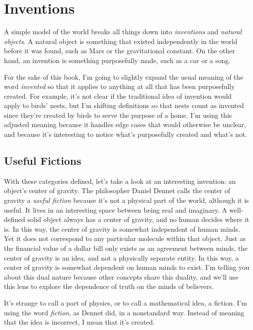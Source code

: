 \documentclass[9pt, twoside]{book}
\theoremstyle{argtstyle}
\begin{document}
\chapter{Inventions}

A simple model of the world breaks all things down into {\em inventions} and
{\em natural objects}.
A natural object is something that existed independently in the
world before it was found, such as Mars or the gravitational constant.
On the other hand, an
invention is something purposefully made, such as
a car or a song.

For the sake of this book, I'm going to slightly expand
the usual meaning of the word {\em invented} so that it applies
to anything at all that has been purposefully created.
For example,
it's not clear if the traditional idea of invention would apply to birds' nests,
but I'm shifting definitions so that nests count as invented since
they're
created by birds to serve the purpose of a
home.
I'm using this adjusted meaning because it handles edge cases that would
otherwise be unclear, and because it's interesting to notice
what's purposefully created and what's not.

\section{Useful Fictions}

With these categories defined,
let's take a look at an interesting invention: an object's
center of gravity.
The philosopher Daniel Dennet calls the center of gravity
a {\em useful fiction}
because it's not a physical part of the world, although it is useful.
It lives in an interesting space between being real and imaginary.
A well-defined solid object always has a center of gravity,
and no human decides where it is.
In this way, the center of gravity
is somewhat independent of human minds.
Yet it does not correspond to any particular molecule within that object.
Just as the financial value of a dollar bill only exists as an agreement between
minds, the center of gravity is an idea, and not a physically separate
entity.
In this way, a center of gravity is somewhat dependent
on human minds to exist.
I'm telling you about this dual nature because
other concepts share this duality, and we'll use this lens to explore
the dependence of truth on the minds of believers.

It's strange to call a part of physics, or to call a mathematical idea, a
fiction. 
I'm using the word {\em fiction}, as Dennet did, in a
nonstandard way.
Instead of meaning that the idea is incorrect, I mean that it's created.
\end{document}
